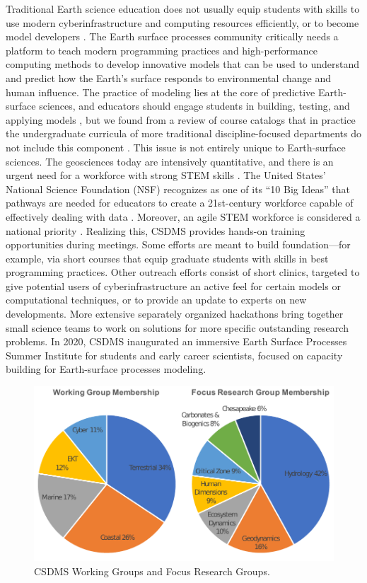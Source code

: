 \documentclass[journal abbreviation, manuscript]{copernicus}
\begin{document}
Traditional Earth science education does not usually equip students with skills to use modern cyberinfrastructure and computing resources efficiently, or to become model developers \citep{campbell2013taking}. The Earth surface processes community critically needs a platform to teach modern programming practices and high-performance computing methods to develop innovative models that can be used to understand and predict how the Earth’s surface responds to environmental change and human influence.
The practice of modeling lies at the core of predictive Earth-surface sciences, and educators should engage students in building, testing, and applying models \citep{hestenes1996modeling,manduca2008making}, but we found from a review of course catalogs that in practice the undergraduate curricula of more traditional discipline-focused departments do not include this component \citep{campbell2013taking}. This issue is not entirely unique to Earth-surface sciences. The geosciences today are intensively quantitative, and there is an urgent need for a workforce with strong STEM skills \citep{national2012discipline}. The United States' National Science Foundation (NSF) recognizes as one of its ``10 Big Ideas'' that pathways are needed for educators to create a 21st-century workforce capable of effectively dealing with data \citep{king2017reimagining}. Moreover, an agile STEM workforce is considered a national priority \citep{atkins2011national}. Realizing this, CSDMS provides hands-on training opportunities during meetings. Some efforts are meant to build foundation---for example, via short courses that equip graduate students with skills in best programming practices. Other outreach efforts consist of short clinics, targeted to give potential users of cyberinfrastructure an active feel for certain models or computational techniques, or to provide an update to experts on new developments. More extensive separately organized hackathons bring together small science teams to work on solutions for more specific outstanding research problems.  In 2020, CSDMS inaugurated an immersive Earth Surface Processes Summer Institute for students and early career scientists, focused on capacity building for Earth-surface processes modeling.

\begin{figure}[h!]
\centering
\includegraphics[scale=0.9]{Figures/fig15.pdf}
\caption{CSDMS Working Groups and Focus Research Groups.}
\label{fig:groups}
\end{figure}
\end{document}
